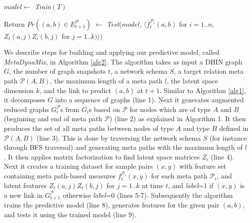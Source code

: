 \begin{algorithm}[t]
\begin{algorithmic}[1]

\ENDFOR

\STATE $model \leftarrow$ \textit{Train}$(T)$

\STATE Return $Pr((a,b)\in E^\mathcal{P}_{t+1})$ $\leftarrow$ \textit{Test}($model$, $\langle$$f^{\mathcal{P}_i}_{t}(a,b)$ for $i=1..n$, $Z_t(a,j)Z_t(b,j)$ for $j=1..k)\rangle)$

\end{algorithmic}
\end{algorithm}



We describe steps for building and applying our predictive model, called \textit{MetaDynaMix}, in Algorithm \ref{alg2}. The algorithm takes as input a DHIN graph $G$, the number of graph snapshots $t$, a network schema $S$, a target relation meta path $\mathcal{P}(A,B)$, the maximum length of a meta path $l$, the latent space dimension $k$, and the link to predict $(a,b)$ at $t+1$. Similar to Algorithm \ref{alg1}, it decomposes $G$ into a sequence of graphs (line 1). Next it generates augmented reduced graphs $G^\mathcal{P}_i$s from $G_i$s based on $\mathcal{P}$ for nodes which are of type $A$ and $B$ (beginning and end of meta path $\mathcal{P}$) (line 2) as explained in Algorithm 1. It then produces the set of all meta paths between nodes of type $A$ and type $B$ defined in $\mathcal{P}(A,B)$ (line 3). This is done by traversing the network schema $S$ (for instance through BFS traversal) and generating meta paths with the maximum length of $l$. It then applies matrix factorization to find latent space matrices $Z_i$ (line 4). %
Next it creates a training dataset for sample pairs $(x,y)$ with feature set containing meta path-based measures $f^{\mathcal{P}_i}_t(x,y)$ for each meta path $\mathcal{P}_i$, and latent features $Z_t(a,j)Z_t(b,j)$ for $j=1..k$ at time $t$, and \textit{label}=1 if $(x,y)$ is a new link in $G^\mathcal{P}_{t+1}$ otherwise \textit{label}=0 (lines 5-7). Subsequently the algorithm trains the predictive model (line 8), generates features for the given pair $(a,b)$, and tests it using the trained model (line 9). %

